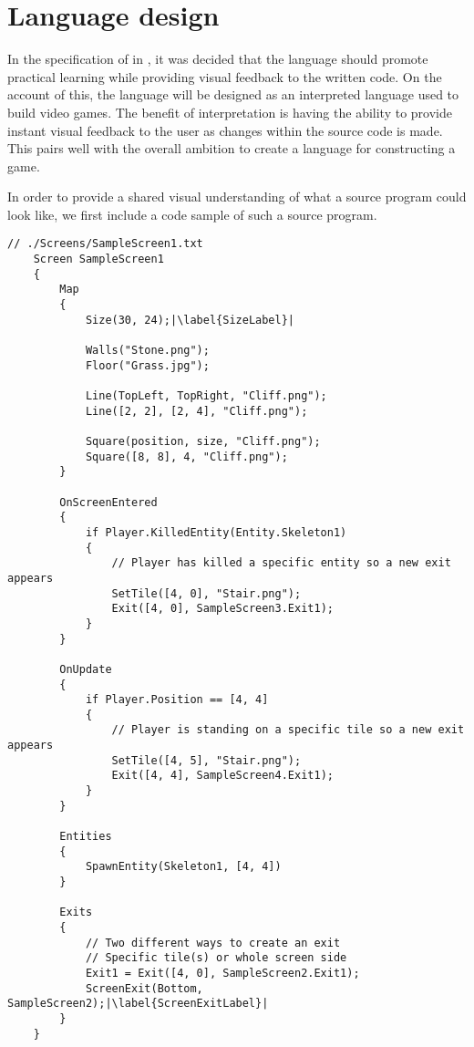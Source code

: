 \chapter{Language design}\label{chap:language_design}
In the specification of \dazel{} in , it was decided that the language should promote practical learning while providing visual feedback to the written code. On the account of this, the \dazel{} language will be designed as an interpreted language used to build video games. The benefit of interpretation is having the ability to provide instant visual feedback to the user as changes within the source code is made. This pairs well with the overall ambition to create a language for constructing a game.

In order to provide a shared visual understanding of what a source program could look like, we first include a code sample of such a source program.

\begin{lstlisting}[caption={Example screen.}, label={lst:SampleScreen1},escapechar=|]
    // ./Screens/SampleScreen1.txt
    Screen SampleScreen1 
    {
        Map 
        {
            Size(30, 24);|\label{SizeLabel}|
    
            Walls("Stone.png"); 
            Floor("Grass.jpg");
    
            Line(TopLeft, TopRight, "Cliff.png");
            Line([2, 2], [2, 4], "Cliff.png");
    
            Square(position, size, "Cliff.png");
            Square([8, 8], 4, "Cliff.png");
        }
    
        OnScreenEntered
        {
            if Player.KilledEntity(Entity.Skeleton1) 
            {
                // Player has killed a specific entity so a new exit appears
                SetTile([4, 0], "Stair.png");
                Exit([4, 0], SampleScreen3.Exit1);
            }
        }
    
        OnUpdate
        {
            if Player.Position == [4, 4] 
            {
                // Player is standing on a specific tile so a new exit appears
                SetTile([4, 5], "Stair.png");
                Exit([4, 4], SampleScreen4.Exit1);
            }
        }
    
        Entities
        {
            SpawnEntity(Skeleton1, [4, 4])
        }
        
        Exits 
        {
            // Two different ways to create an exit
            // Specific tile(s) or whole screen side
            Exit1 = Exit([4, 0], SampleScreen2.Exit1);
            ScreenExit(Bottom, SampleScreen2);|\label{ScreenExitLabel}|
        }
    }
    \end{lstlisting}

